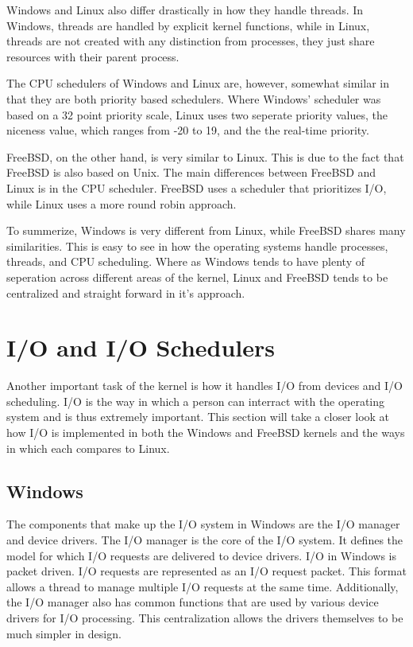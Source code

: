 \documentclass[journal,letterpaper,draftclsnofoot,onecolumn,10pt]{IEEEtran}
\begin{document}
Windows and Linux also differ drastically in how they handle threads. In Windows, threads are handled by explicit kernel functions, while in Linux, threads are not created with any distinction from processes, they just share resources with their parent process.\cite{l05}

The CPU schedulers of Windows and Linux are, however, somewhat similar in that they are both priority based schedulers. Where Windows' scheduler was based on a 32 point priority scale, Linux uses two seperate priority values, the niceness value, which ranges from -20 to 19, and the the real-time priority.\cite{l05}

FreeBSD, on the other hand, is very similar to Linux. This is due to the fact that FreeBSD is also based on Unix. The main differences between FreeBSD and Linux is in the CPU scheduler. FreeBSD uses a scheduler that prioritizes I/O, while Linux uses a more round robin approach.

To summerize, Windows is very different from Linux, while FreeBSD shares many similarities. This is easy to see in how the operating systems handle processes, threads, and CPU scheduling. Where as Windows tends to have plenty of seperation across different areas of the kernel, Linux and FreeBSD tends to be centralized and straight forward in it's approach.

\section{I/O and I/O Schedulers}

Another important task of the kernel is how it handles I/O from devices and I/O scheduling. I/O is the way in which a person can interract with the operating system and is thus extremely important. This section will take a closer look at how I/O is implemented in both the Windows and FreeBSD kernels and the ways in which each compares to Linux.

\subsection{Windows}

The components that make up the I/O system in Windows are the I/O manager and device drivers. The I/O manager is the core of the I/O system. It defines the model for which I/O requests are delivered to device drivers. I/O in Windows is packet driven. I/O requests are represented as an I/O request packet. This format allows a thread to manage multiple I/O requests at the same time. Additionally, the I/O manager also has common functions that are used by various device drivers for I/O processing. This centralization allows the drivers themselves to be much simpler in design.\cite{2ris12}
 
\end{document}
